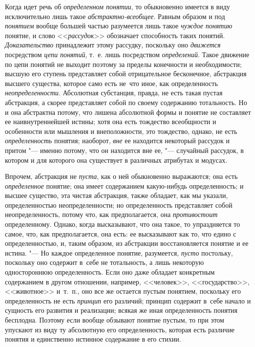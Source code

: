 Когда идет речь об {\em определенном понятии},
то обыкновенно имеется в виду исключительно лишь такое
{\em абстрактно-всеобщее}. Равным образом и под
{\em понятием} вообще большей частью разумеется лишь такое
{\em чуждое понятию} понятие, и слово <<{\em рассудок}>>
обозначает способность таких понятий. {\em Доказательство}
принадлежит этому рассудку, поскольку оно {\em движется}
посредством {\em цепи понятий}, т.~е. лишь посредством {\em определений}.
Такое движение по цепи понятий не выходит поэтому за пределы конечности и
необходимости; высшую его ступень представляет собой отрицательное
бесконечное, абстракция высшего существа, которое само есть не~что иное,
как определенность {\em неопределенности}.
Абсолютная субстанция, правда, не есть такая пустая
абстракция, а скорее представляет собой по своему содержанию тотальность.
Но и она абстрактна потому, что лишена абсолютной формы и понятие не
составляет ее наивнутреннейшей истины; хотя она есть тождество всеобщности
и особенности или мышления и внеположности, это тождество,
однако, не есть {\em определенность} понятия; наоборот, {\em вне} ее находится
некоторый рассудок и притом "--- именно потому, что он
находится вне ее, "--- случайный рассудок, в котором и для
которого она существует в различных атрибутах и
модусах.

Впрочем, абстракция не {\em пуста}, как о ней
обыкновенно выражаются; она есть {\em определенное}
понятие; она имеет содержанием какую-нибудь определенность; и
высшее существо, эта чистая абстракция, также обладает, как мы указали,
определенностью неопределенности; но определенность представляет собой
неопределенность, потому что, как предполагается, она {\em противостоит}
определенному. Однако, когда высказывают, что она такое, то
упраздняется то самое, что, как предполагается, она есть: ее высказывают
как то, что едино с определенностью, и, таким образом, из абстракции
восстановляется понятие и ее истина. "--- Но каждое
определенное понятие, разумеется, {\em пусто} постольку,
поскольку оно содержит в~себе не тотальность, а лишь некоторую одностороннюю
определенность. Если оно даже обладает конкретным содержанием в другом
отношении, например, <<человек>>, <<государство>>, <<животное>> и~т.~п.,
оно все же остается пустым понятием, поскольку его определенность не есть
{\em принцип} его различий; принцип содержит в~себе начало и сущность его
развития и реализации; всякая же иная определенность понятия бесплодна. Поэтому
если вообще обзывают понятие пустым, то при этом упускают из виду ту абсолютную
его определенность, которая есть различие понятия и единственно истинное
содержание в его стихии.

